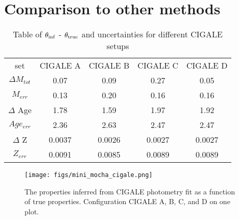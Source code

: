 \section{Comparison to other methods} \label{sec:compare} 

\begin{table}
\caption{Table of $\theta_{\rm inf}$ - $\theta_{\rm true}$ and uncertainties for different CIGALE setups  } 
\begin{center} 
\begin{tabular}{ccccc} \toprule
set & CIGALE A & CIGALE B & CIGALE C & CIGALE D \\
$\Delta M_{tot}$ & 0.07 & 0.09 & 0.27 & 0.05\\
$M_{err}$ & 0.13 & 0.20 & 0.16 & 0.16\\
$\Delta$ Age & 1.78 & 1.59 & 1.97& 1.92\\
$Age_{err}$ & 2.36 & 2.63 & 2.47 & 2.47\\
$\Delta$ Z & 0.0037 & 0.0026 & 0.0027 & 0.0027\\
$Z_{err}$ & 0.0091 & 0.0085 & 0.0089 & 0.0089\\
\hline 
\hline            
\end{tabular} \label{tab:setups}
\end{center}
\end{table}

\begin{figure}
\begin{center}
\texttt{[image: figs/mini\_mocha\_cigale.png]} 
\caption{The properties inferred from CIGALE photometry fit as a function of true properties. Configuration CIGALE A, B, C, and D on one plot.
}
\label{fig:photo_cigaleALL}
\end{center}
\end{figure}


